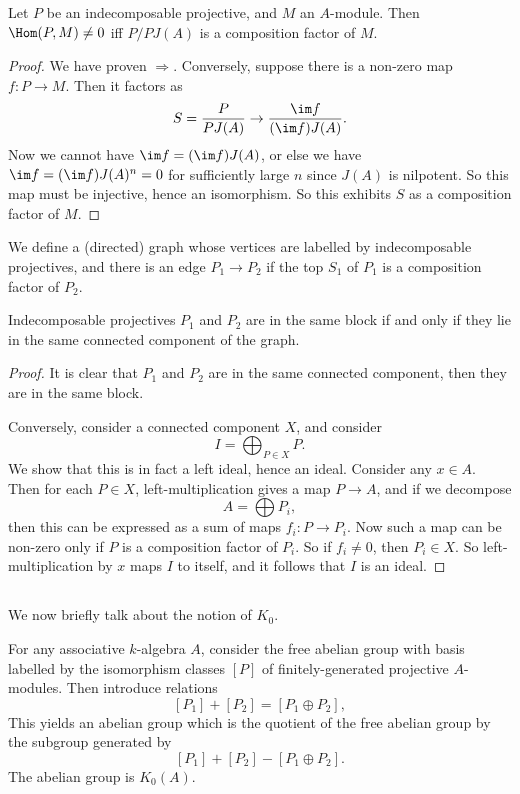 \documentclass[a4paper]{article}
\begin{document}
\begin{lemma}
  Let $P$ be an indecomposable projective, and $M$ an $A$-module. Then $\Hom(P, M) \not= 0$ iff $P/P J(A)$ is a composition factor of $M$.
\end{lemma}

\begin{proof}
  We have proven $\Rightarrow$. Conversely, suppose there is a non-zero map $f: P \to M$. Then it factors as
  \[
    S = \frac{P}{PJ(A)} \to \frac{\im f}{(\im f)J(A)}.
  \]
  Now we cannot have $\im f = (\im f)J(A)$, or else we have $\im f = (\im f)J(A)^n = 0$ for sufficiently large $n$ since $J(A)$ is nilpotent. So this map must be injective, hence an isomorphism. So this exhibits $S$ as a composition factor of $M$.
\end{proof}

We define a (directed) graph whose vertices are labelled by indecomposable projectives, and there is an edge $P_1 \to P_2$ if the top $S_1$ of $P_1$ is a composition factor of $P_2$.
\begin{thm}
  Indecomposable projectives $P_1$ and $P_2$ are in the same block if and only if they lie in the same connected component of the graph.
\end{thm}

\begin{proof}
  It is clear that $P_1$ and $P_2$ are in the same connected component, then they are in the same block.

  Conversely, consider a connected component $X$, and consider
  \[
    I = \bigoplus_{P \in X} P.
  \]
  We show that this is in fact a left ideal, hence an ideal. Consider any $x \in A$. Then for each $P \in X$, left-multiplication gives a map $P \to A$, and if we decompose
  \[
    A = \bigoplus P_i,
  \]
  then this can be expressed as a sum of maps $f_i: P \to P_i$. Now such a map can be non-zero only if $P$ is a composition factor of $P_i$. So if $f_i \not= 0$, then $P_i \in X$. So left-multiplication by $x$ maps $I$ to itself, and it follows that $I$ is an ideal.
\end{proof}

\subsection{}
We now briefly talk about the notion of $K_0$.
\begin{defi}[$K_0$]
  For any associative $k$-algebra $A$, consider the free abelian group with basis labelled by the isomorphism classes $[P]$ of finitely-generated projective $A$-modules. Then introduce relations
  \[
    [P_1] + [P_2] = [P_1 \oplus P_2],
  \]
  This yields an abelian group which is the quotient of the free abelian group by the subgroup generated by
  \[
    [P_1] + [P_2] - [P_1 \oplus P_2].
  \]
  The abelian group is $K_0(A)$.
\end{defi}
\end{document}
